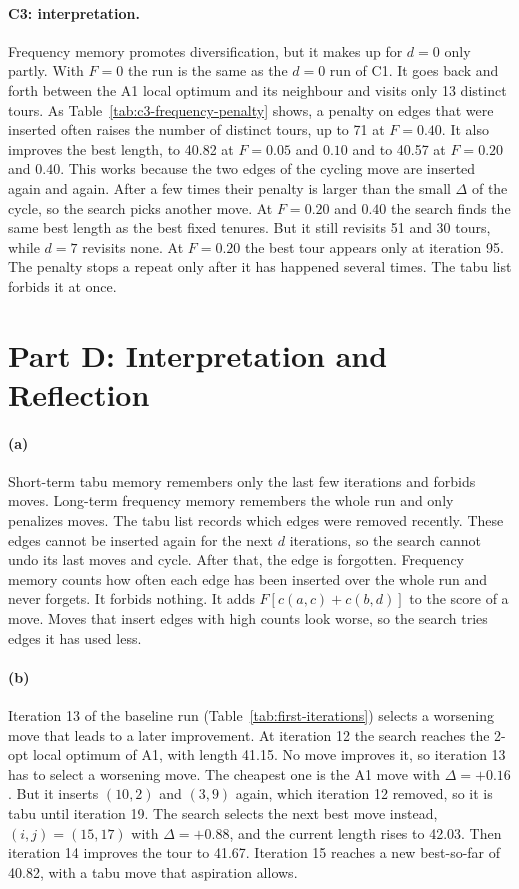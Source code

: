 \documentclass[11pt]{article}
\begin{document}
\paragraph{C3: interpretation.}
Frequency memory promotes diversification, but it makes up for $d = 0$ only partly. With $F = 0$ the run is the same as the $d = 0$ run of C1. It goes back and forth between the A1 local optimum and its neighbour and visits only 13 distinct tours. As Table~\ref{tab:c3-frequency-penalty} shows, a penalty on edges that were inserted often raises the number of distinct tours, up to 71 at $F = 0.40$. It also improves the best length, to 40.82 at $F = 0.05$ and $0.10$ and to 40.57 at $F = 0.20$ and $0.40$. This works because the two edges of the cycling move are inserted again and again. After a few times their penalty is larger than the small $\Delta$ of the cycle, so the search picks another move. At $F = 0.20$ and $0.40$ the search finds the same best length as the best fixed tenures. But it still revisits 51 and 30 tours, while $d = 7$ revisits none. At $F = 0.20$ the best tour appears only at iteration 95. The penalty stops a repeat only after it has happened several times. The tabu list forbids it at once.

\section*{Part D: Interpretation and Reflection}

\paragraph{(a)}
Short-term tabu memory remembers only the last few iterations and forbids moves. Long-term frequency memory remembers the whole run and only penalizes moves. The tabu list records which edges were removed recently. These edges cannot be inserted again for the next $d$ iterations, so the search cannot undo its last moves and cycle. After that, the edge is forgotten. Frequency memory counts how often each edge has been inserted over the whole run and never forgets. It forbids nothing. It adds $F \left[ c(a, c) + c(b, d) \right]$ to the score of a move. Moves that insert edges with high counts look worse, so the search tries edges it has used less.

\paragraph{(b)}
Iteration 13 of the baseline run (Table~\ref{tab:first-iterations}) selects a worsening move that leads to a later improvement. At iteration 12 the search reaches the 2-opt local optimum of A1, with length 41.15. No move improves it, so iteration 13 has to select a worsening move. The cheapest one is the A1 move with $\Delta = +0.16$. But it inserts $(10, 2)$ and $(3, 9)$ again, which iteration 12 removed, so it is tabu until iteration 19. The search selects the next best move instead, $(i, j) = (15, 17)$ with $\Delta = +0.88$, and the current length rises to 42.03. Then iteration 14 improves the tour to 41.67. Iteration 15 reaches a new best-so-far of 40.82, with a tabu move that aspiration allows.
\end{document}
